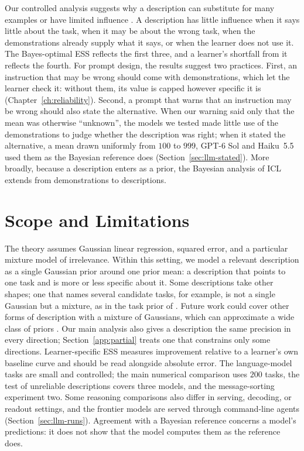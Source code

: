 Our controlled analysis suggests why a description can substitute for many examples \citep{honda2025} or have limited influence \citep{webson2022,gupta2025,gloaguen2026}. A description has little influence when it says little about the task, when it may be about the wrong task, when the demonstrations already supply what it says, or when the learner does not use it. The Bayes-optimal ESS reflects the first three, and a learner's shortfall from it reflects the fourth. For prompt design, the results suggest two practices. First, an instruction that may be wrong should come with demonstrations, which let the learner check it: without them, its value is capped however specific it is (Chapter~\ref{ch:reliability}). Second, a prompt that warns that an instruction may be wrong should also state the alternative. When our warning said only that the mean was otherwise ``unknown'', the models we tested made little use of the demonstrations to judge whether the description was right; when it stated the alternative, a mean drawn uniformly from $100$ to $999$, GPT-6 Sol and Haiku~5.5 used them as the Bayesian reference does (Section~\ref{sec:llm-stated}). More broadly, because a description enters as a prior, the Bayesian analysis of ICL extends from demonstrations to descriptions.

\section{Scope and Limitations}\label{sec:limitations}

The theory assumes Gaussian linear regression, squared error, and a particular mixture model of irrelevance. Within this setting, we model a relevant description as a single Gaussian prior around one prior mean: a description that points to one task and is more or less specific about it. Some descriptions take other shapes; one that names several candidate tasks, for example, is not a single Gaussian but a mixture, as in the task prior of \citet{lin2024}. Future work could cover other forms of description with a mixture of Gaussians, which can approximate a wide class of priors \citep{dalal1983}. Our main analysis also gives a description the same precision in every direction; Section~\ref{app:partial} treats one that constrains only some directions. Learner-specific ESS measures improvement relative to a learner's own baseline curve and should be read alongside absolute error. The language-model tasks are small and controlled; the main numerical comparison uses $200$ tasks, the test of unreliable descriptions covers three models, and the message-sorting experiment two. Some reasoning comparisons also differ in serving, decoding, or readout settings, and the frontier models are served through command-line agents (Section~\ref{sec:llm-runs}). Agreement with a Bayesian reference concerns a model's predictions: it does not show that the model computes them as the reference does.

